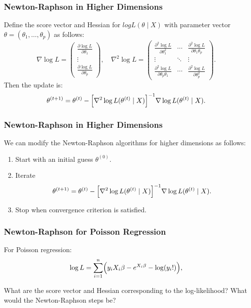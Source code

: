 \documentclass{beamer}
\begin{document}
\begin{frame}
\frametitle{Newton-Raphson in Higher Dimensions}
 Define the score vector and Hessian for $log L(\theta \mid X)$ with parameter vector $\theta = (\theta_1,\dots,\theta_p)$ as follows:
\[
\nabla \log L =
\begin{pmatrix}
\frac{\partial \log L}{\partial \theta_1}\\[1mm]
\vdots\\[1mm]
\frac{\partial \log L}{\partial \theta_p}
\end{pmatrix},\quad
\nabla^2 \log L =
\begin{pmatrix}
\frac{\partial^2 \log L}{\partial \theta_1^2} & \cdots & \frac{\partial^2 \log L}{\partial \theta_1\theta_p}\\[1mm]
\vdots & \ddots & \vdots\\[1mm]
\frac{\partial^2 \log L}{\partial \theta_p\theta_1} & \cdots & \frac{\partial^2 \log L}{\partial \theta_p^2}
\end{pmatrix}.
\]
Then the update is:
\[
\theta^{(t+1)} = \theta^{(t)} - \Bigl[\nabla^2 \log L(\theta^{(t)} \mid X)\Bigr]^{-1} \nabla \log L(\theta^{(t)} \mid X).
\]
\end{frame}

\begin{frame}
\frametitle{Newton-Raphson in Higher Dimensions}


We can modify the Newton-Raphson algorithms for higher dimensions as follows:

\begin{enumerate}
\item Start with an initial guess $\theta^{(0)}$.
\item Iterate \[
\theta^{(t+1)} = \theta^{(t)} - \Bigl[\nabla^2 \log L(\theta^{(t)} \mid X)\Bigr]^{-1} \nabla \log L(\theta^{(t)} \mid X).
\]
\item Stop when convergence criterion is satisfied. 
\end{enumerate}
\end{frame}

\begin{frame}
\frametitle{Newton-Raphson for Poisson Regression}

For Poisson regression:
\[
\log L = \sum_{i=1}^n \Bigl( y_i X_i \beta - e^{X_i \beta} - \log (y_i!) \Bigr),
\]

What are the score vector and Hessian corresponding to the log-likelihood? What would the Newton-Raphson steps be?

\end{frame}
\end{document}
